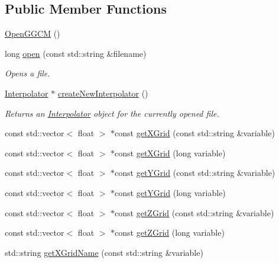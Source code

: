 \subsection*{Public Member Functions}
\begin{DoxyCompactItemize}
\item 
\hyperlink{classccmc_1_1_open_g_g_c_m_a715c1d53f3f1a7f86335cf1d4a0f2d49}{Open\-G\-G\-C\-M} ()
\item 
long \hyperlink{classccmc_1_1_open_g_g_c_m_a899907309758135dbabc0d3c7b465900}{open} (const std\-::string \&filename)
\begin{DoxyCompactList}\small\item\em Opens a file.  \end{DoxyCompactList}\item 
\hyperlink{classccmc_1_1_interpolator}{Interpolator} $\ast$ \hyperlink{classccmc_1_1_open_g_g_c_m_acb2b4bd259e7dbe3d0cce0f3261408fc}{create\-New\-Interpolator} ()
\begin{DoxyCompactList}\small\item\em Returns an \hyperlink{classccmc_1_1_interpolator}{Interpolator} object for the currently opened file.  \end{DoxyCompactList}\item 
const std\-::vector$<$ float $>$ $\ast$const \hyperlink{classccmc_1_1_open_g_g_c_m_a8c172438ab77813c8f7d9aa469880ef7}{get\-X\-Grid} (const std\-::string \&variable)
\item 
const std\-::vector$<$ float $>$ $\ast$const \hyperlink{classccmc_1_1_open_g_g_c_m_a1941051d7f42a047f1b98641c377ccc0}{get\-X\-Grid} (long variable)
\item 
const std\-::vector$<$ float $>$ $\ast$const \hyperlink{classccmc_1_1_open_g_g_c_m_acfddf469faddcd316c526984498a363a}{get\-Y\-Grid} (const std\-::string \&variable)
\item 
const std\-::vector$<$ float $>$ $\ast$const \hyperlink{classccmc_1_1_open_g_g_c_m_af35f6bd0be73508e6d8ccff87f255847}{get\-Y\-Grid} (long variable)
\item 
const std\-::vector$<$ float $>$ $\ast$const \hyperlink{classccmc_1_1_open_g_g_c_m_a855b01fafc8c5b01426e2aa5e68b0d6e}{get\-Z\-Grid} (const std\-::string \&variable)
\item 
const std\-::vector$<$ float $>$ $\ast$const \hyperlink{classccmc_1_1_open_g_g_c_m_a46935e203f1c7c2243de82d7d0c5c09b}{get\-Z\-Grid} (long variable)
\item 
std\-::string \hyperlink{classccmc_1_1_open_g_g_c_m_a00a92fbc85a43f76c71600a6f0892ba3}{get\-X\-Grid\-Name} (const std\-::string \&variable)

\end{DoxyCompactItemize}

